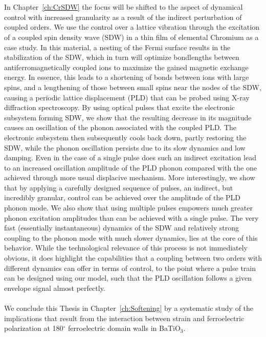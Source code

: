 \\\\
In Chapter~\ref{ch:CrSDW} the focus will be shifted to the aspect of dynamical control with increased granularity as a result of the indirect perturbation of coupled orders.
We use the control over a lattice vibration through the excitation of a coupled spin density wave (SDW) in a thin film of elemental Chromium as a case study.
In this material, a nesting of the Fermi surface results in the stabilization of the SDW, which in turn will optimize bondlengths between antiferromagnetically coupled ions to maximize the gained magnetic exchange energy.
In essence, this leads to a shortening of bonds between ions with large spins, and a lengthening of those between small spins near the nodes of the SDW, causing a periodic lattice displacement (PLD) that can be probed using X-ray diffraction spectroscopy.
By using optical pulses that excite the electronic subsystem forming SDW, we show that the resulting  decrease in its magnitude causes an oscillation of the phonon associated with the coupled PLD.
The electronic subsystem then subsequently cools back down, partly restoring the SDW, while the phonon oscillation persists due to its slow dynamics and low damping.
Even in the case of a single pulse does such an indirect excitation lead to an increased oscillation amplitude of the PLD phonon compared with the one achieved through more usual displacive mechanism.
More interestingly, we show that by applying a carefully designed sequence of pulses, an indirect, but incredibly granular, control can be achieved over the amplitude of the PLD phonon mode.
We also show that using multiple pulses empowers much greater phonon excitation amplitudes than can be achieved with a single pulse.
The very fast (essentially instantaneous) dynamics of the SDW and relatively strong coupling to the phonon mode with much slower dynamics, lies at the core of this behavior.
While the technological relevance of this process is not immediately obvious, it does highlight the capabilities that a coupling between two orders with different dynamics can offer in terms of control, to the point where a pulse train can be designed using our model, such that the PLD oscillation follows a given envelope signal almost perfectly.
\\\\
We conclude this Thesis in Chapter~\ref{ch:Softening} by a systematic study of the implications that result from the interaction between strain and ferroelectric polarization at 180$^\circ$ ferroelectric domain walls in BaTiO$_3$.
